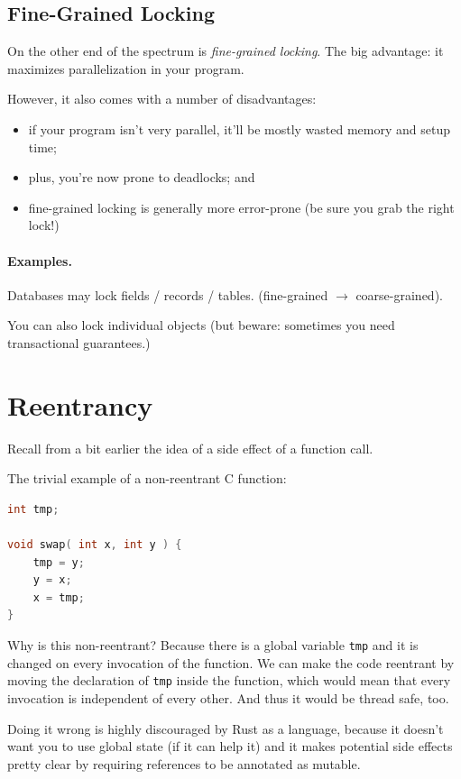 \documentclass[a4paper]{report}
\begin{document}
\subsection*{Fine-Grained Locking}
On the other end of the spectrum is \emph{fine-grained locking}. The big
advantage: it maximizes parallelization in your program.

However, it also comes with a number of disadvantages:
  \begin{itemize}
    \item if your program isn't very parallel, it'll be mostly wasted memory and setup time;
    \item plus, you're now prone to deadlocks; and
    \item fine-grained locking is generally more error-prone (be sure you grab the right lock!)
  \end{itemize}

\paragraph{Examples.}

    Databases may lock fields / records / tables. (fine-grained $\rightarrow$ coarse-grained).

    You can also lock individual objects (but beware: sometimes you need transactional guarantees.)

\section*{Reentrancy}

Recall from a bit earlier the idea of a side effect of a function call.

The trivial example of a non-reentrant C function:
\begin{lstlisting}[language=C]
int tmp;

void swap( int x, int y ) {
    tmp = y;
    y = x;
    x = tmp;
}
\end{lstlisting}

Why is this non-reentrant? Because there is a global variable \texttt{tmp} and it is changed on every invocation of the function. We can make the code reentrant by moving the declaration of \texttt{tmp} inside the function, which would mean that every invocation is independent of every other. And thus it would be thread safe, too.

Doing it wrong is highly discouraged by Rust as a language, because it doesn't want you to use global state (if it can help it) and it makes potential side effects pretty clear by requiring references to be annotated as mutable.
\end{document}
